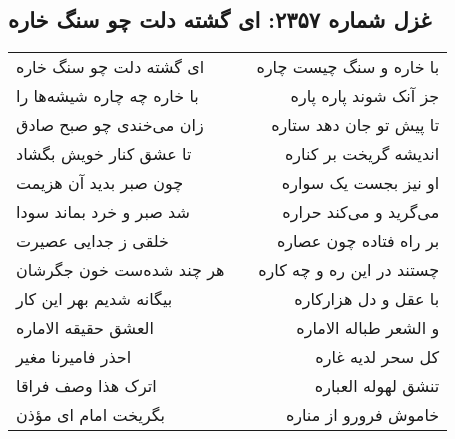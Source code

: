 \begin{center}
\section*{غزل شماره ۲۳۵۷: ای گشته دلت چو سنگ خاره}
\label{sec:2357}
\begin{longtable}{l p{0.5cm} r}
ای گشته دلت چو سنگ خاره
&&
با خاره و سنگ چیست چاره
\\
با خاره چه چاره شیشه‌ها را
&&
جز آنک شوند پاره پاره
\\
زان می‌خندی چو صبح صادق
&&
تا پیش تو جان دهد ستاره
\\
تا عشق کنار خویش بگشاد
&&
اندیشه گریخت بر کناره
\\
چون صبر بدید آن هزیمت
&&
او نیز بجست یک سواره
\\
شد صبر و خرد بماند سودا
&&
می‌گرید و می‌کند حراره
\\
خلقی ز جدایی عصیرت
&&
بر راه فتاده چون عصاره
\\
هر چند شده‌ست خون جگرشان
&&
چستند در این ره و چه کاره
\\
بیگانه شدیم بهر این کار
&&
با عقل و دل هزارکاره
\\
العشق حقیقه الاماره
&&
و الشعر طباله الاماره
\\
احذر فامیرنا مغیر
&&
کل سحر لدیه غاره
\\
اترک هذا وصف فراقا
&&
تنشق لهوله العباره
\\
بگریخت امام ای مؤذن
&&
خاموش فرورو از مناره
\\
\end{longtable}
\end{center}
